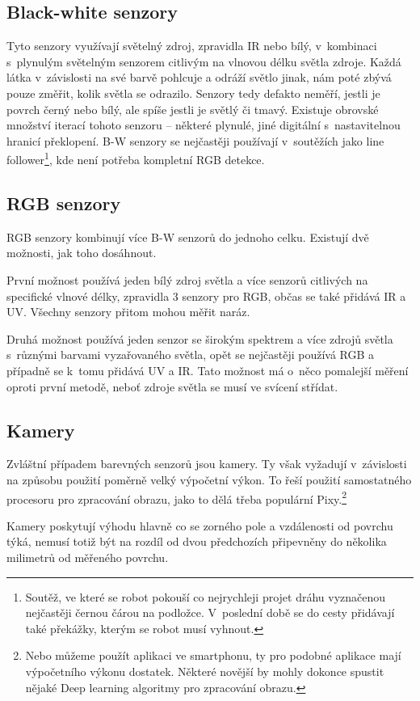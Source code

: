 \subsection{Black-white senzory}
Tyto senzory využívají světelný zdroj, zpravidla IR nebo bílý, v~kombinaci s~plynulým světelným senzorem citlivým na vlnovou délku světla zdroje.
Každá látka v~závislosti na své barvě pohlcuje a odráží světlo jinak, nám poté zbývá pouze změřit, kolik světla se odrazilo.
Senzory tedy defakto neměří, jestli je povrch černý nebo bílý, ale spíše jestli je světlý či tmavý.
Existuje obrovské množství iterací tohoto senzoru -- některé plynulé, jiné digitální s~nastavitelnou hranicí překlopení.
B-W senzory se nejčastěji používají v~soutěžích jako line follower\footnote{Soutěž, ve které se robot pokouší co nejrychleji projet dráhu vyznačenou nejčastěji černou čárou na podložce. V~poslední době se do cesty přidávají také překážky, kterým se robot musí vyhnout.}, kde není potřeba kompletní RGB detekce.

\subsection{RGB senzory}
RGB senzory kombinují více B-W senzorů do jednoho celku.
Existují dvě možnosti, jak toho dosáhnout. 

První možnost používá jeden bílý zdroj světla a více senzorů citlivých na specifické vlnové délky, zpravidla 3 senzory pro RGB, občas se také přidává IR a UV.
Všechny senzory přitom mohou měřit naráz.

Druhá možnost používá jeden senzor se širokým spektrem a více zdrojů světla s~různými barvami vyzařovaného světla, opět se nejčastěji používá RGB a případně se k~tomu přidává UV a IR.
Tato možnost má o~něco pomalejší měření oproti první metodě, neboť zdroje světla se musí ve svícení střídat.

\subsection{Kamery}
Zvláštní případem barevných senzorů jsou kamery.
Ty však vyžadují v~závislosti na způsobu použití poměrně velký výpočetní výkon.
To řeší použití samostatného procesoru pro zpracování obrazu, jako to dělá třeba populární Pixy.\footnote{Nebo můžeme použít aplikaci ve smartphonu, ty pro podobné aplikace mají výpočetního výkonu dostatek. Některé novější by mohly dokonce spustit nějaké Deep learning algoritmy pro zpracování obrazu.}

Kamery poskytují výhodu hlavně co se zorného pole a vzdálenosti od povrchu týká, nemusí totiž být na rozdíl od dvou předchozích připevněny do několika milimetrů od měřeného povrchu.

